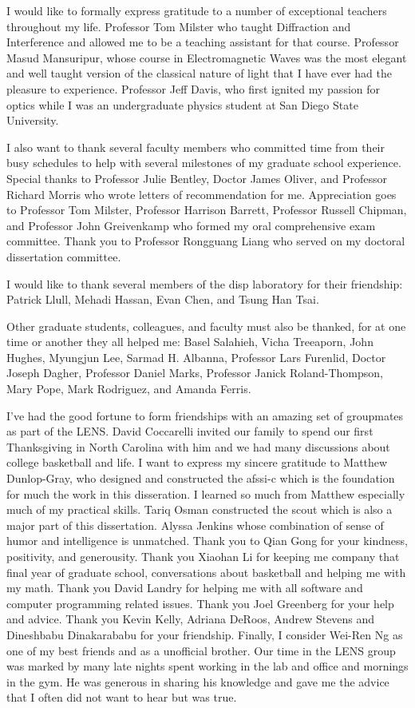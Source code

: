 I would like to formally express gratitude to a number of exceptional teachers throughout my life. Professor Tom Milster who taught Diffraction and Interference and allowed me to be a teaching assistant for that course. Professor Masud Mansuripur, whose course in Electromagnetic Waves was the most elegant and well taught version of the classical nature of light that I have ever had the pleasure to experience. Professor Jeff Davis, who first ignited my passion for optics while I was an undergraduate physics student at San Diego State University.

I also want to thank several faculty members who committed time from their busy schedules to help with several milestones of my graduate school experience. Special thanks to Professor Julie Bentley, Doctor James Oliver, and Professor Richard Morris who wrote letters of recommendation for me. Appreciation goes to Professor Tom Milster, Professor Harrison Barrett, Professor Russell Chipman, and Professor John Greivenkamp who formed my oral comprehensive exam committee. Thank you to Professor Rongguang Liang who served on my doctoral dissertation committee.

I would like to thank several members of the \gls{disp} laboratory for their friendship: Patrick Llull, Mehadi Hassan, Evan Chen, and Tsung Han Tsai.

Other graduate students, colleagues, and faculty must also be thanked, for at one time or another they all helped me: Basel Salahieh, Vicha Treeaporn, John Hughes, Myungjun Lee, Sarmad H. Albanna, Professor Lars Furenlid, Doctor Joseph Dagher, Professor Daniel Marks, Professor Janick Roland-Thompson, Mary Pope, Mark Rodriguez, and Amanda Ferris. 

I've had the good fortune to form friendships with an amazing set of groupmates as part of the \gls{LENS}. David Coccarelli invited our family to spend our first Thanksgiving in North Carolina with him and we had many discussions about college basketball and life. I want to express my sincere gratitude to Matthew Dunlop-Gray, who designed and constructed the \gls{afssi-c} which is the foundation for much the work in this disseration. I learned so much from Matthew especially much of my practical skills. Tariq Osman constructed the \gls{scout} which is also a major part of this dissertation. Alyssa Jenkins whose combination of sense of humor and intelligence is unmatched. Thank you to Qian Gong for your kindness, positivity, and generousity. Thank you Xiaohan Li for keeping me company that final year of graduate school, conversations about basketball and helping me with my math. Thank you David Landry for helping me with all software and computer programming related issues. Thank you Joel Greenberg for your help and advice. Thank you Kevin Kelly, Adriana DeRoos, Andrew Stevens and Dineshbabu Dinakarababu for your friendship. Finally, I consider Wei-Ren Ng as one of my best friends and as a unofficial brother. Our time in the \gls{LENS} group was marked by many late nights spent working in the lab and office and mornings in the gym. He was generous in sharing his knowledge and gave me the advice that I often did not want to hear but was true. 

